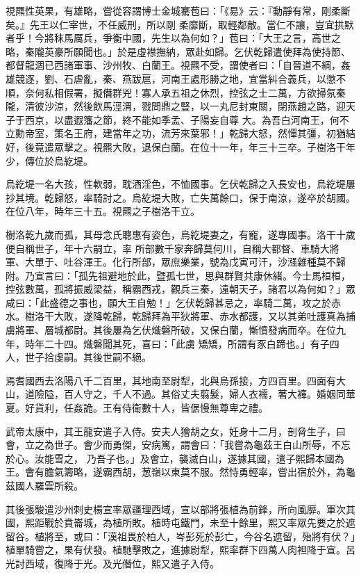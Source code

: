 \begin{pinyinscope}
 視羆性英果，有雄略，嘗從容謂博士金城騫苞曰：「《易》云：『動靜有常，剛柔斷矣。』先王以仁宰世，不任威刑，所以剛
 柔靡斷，取輕鄰敵。當仁不讓，豈宜拱默者乎！今將秣馬厲兵，爭衡中國，先生以為何如？」苞曰：「大王之言，高世之略，秦隴英豪所願聞也。」於是虛襟撫納，眾赴如歸。乞伏乾歸遣使拜為使持節、都督龍涸已西諸軍事、沙州牧、白蘭王。視羆不受，謂使者曰：「自晉道不綱，姦雄競逐，劉、石虐亂，秦、燕跋扈，河南王處形勝之地，宜當糾合義兵，以懲不順，奈何私相假署，擬僭群兇！寡人承五祖之休烈，控弦之士二萬，方欲掃氛秦隴，清彼沙涼，然後飲馬涇渭，戮問鼎之豎，以一丸尼封東關，閉燕趙之路，迎天子于西京，以盡遐籓之節，終不能如季孟、子陽妄自尊
 大。為吾白河南王，何不立勳帝室，策名王府，建當年之功，流芳來葉邪！」乾歸大怒，然憚其彊，初猶結好，後竟遣眾擊之。視羆大敗，退保白蘭。在位十一年，年三十三卒。子樹洛干年少，傳位於烏紇堤。



 烏紇堤一名大孩，性軟弱，耽酒淫色，不恤國事。乞伏乾歸之入長安也，烏紇堤屢抄其境。乾歸怒，率騎討之。烏紇堤大敗，亡失萬餘口，保于南涼，遂卒於胡國。在位八年，時年三十五。視羆之子樹洛干立。



 樹洛乾九歲而孤，其母念氏聰惠有姿色，烏紇堤妻之，有寵，遂專國事。洛干十歲便自稱世子，年十六嗣立，率
 所部數千家奔歸莫何川，自稱大都督、車騎大將軍、大單于、吐谷渾王。化行所部，眾庶樂業，號為戊寅可汗，沙漒雜種莫不歸附。乃宣言曰：「孤先祖避地於此，暨孤七世，思與群賢共康休緒。今士馬桓桓，控弦數萬，孤將振威梁益，稱霸西戎，觀兵三秦，遠朝天子，諸君以為何如？」眾咸曰：「此盛德之事也，願大王自勉！」乞伏乾歸甚忌之，率騎二萬，攻之於赤水。樹洛干大敗，遂降乾歸，乾歸拜為平狄將軍、赤水都護，又以其弟吐護真為捕虜將軍、層城都尉。其後屢為乞伏熾磐所破，又保白蘭，慚憤發病而卒。在位九年，時年二十四。熾磐聞其死，喜曰：「此虜
 矯矯，所謂有豕白蹄也。」有子四人，世子拾虔嗣。其後世嗣不絕。



 焉耆國西去洛陽八千二百里，其地南至尉犁，北與烏孫接，方四百里。四面有大山，道險隘，百人守之，千人不過。其俗丈夫翦髮，婦人衣襦，著大褲。婚姻同華夏。好貨利，任姦詭。王有侍衛數十人，皆倨慢無尊卑之禮。



 武帝太康中，其王龍安遣子入侍。安夫人獪胡之女，妊身十二月，剖脅生子，曰會，立之為世子。會少而勇傑，安病篤，謂會曰：「我嘗為龜茲王白山所辱，不忘於心。汝能雪之，
 乃吾子也。」及會立，襲滅白山，遂據其國，遣子熙歸本國為王。會有膽氣籌略，遂霸西胡，葱嶺以東莫不服。然恃勇輕率，嘗出宿於外，為龜茲國人羅雲所殺。



 其後張駿遣沙州刺史楊宣率眾疆理西域，宣以部將張植為前鋒，所向風靡。軍次其國，熙距戰於賁崙城，為植所敗。植時屯鐵門，未至十餘里，熙又率眾先要之於遮留谷。植將至，或曰：「漢祖畏於柏人，岑彭死於彭亡，今谷名遮留，殆將有伏？」植單騎嘗之，果有伏發。植馳擊敗之，進據尉犁，熙率群下四萬人肉袒降于宣。呂光討西域，復降于光。及光僭位，熙又遣子入侍。




\end{pinyinscope}
